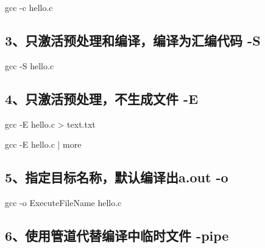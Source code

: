 \documentclass[
]{article}
\newenvironment{Shaded}{}{}
\newcommand{\NormalTok}[1]{#1}
\begin{document}
\begin{Shaded}
\begin{Highlighting}[]
\NormalTok{gcc {-}c hello.c}
\end{Highlighting}
\end{Shaded}

\hypertarget{3ux53eaux6fc0ux6d3bux9884ux5904ux7406ux548cux7f16ux8bd1ux7f16ux8bd1ux4e3aux6c47ux7f16ux4ee3ux7801--s}{%
\subsection{3、只激活预处理和编译，编译为汇编代码
-S}\label{3ux53eaux6fc0ux6d3bux9884ux5904ux7406ux548cux7f16ux8bd1ux7f16ux8bd1ux4e3aux6c47ux7f16ux4ee3ux7801--s}}

\begin{Shaded}
\begin{Highlighting}[]
\NormalTok{gcc {-}S hello.c}
\end{Highlighting}
\end{Shaded}

\hypertarget{4ux53eaux6fc0ux6d3bux9884ux5904ux7406ux4e0dux751fux6210ux6587ux4ef6--e}{%
\subsection{4、只激活预处理，不生成文件
-E}\label{4ux53eaux6fc0ux6d3bux9884ux5904ux7406ux4e0dux751fux6210ux6587ux4ef6--e}}

\begin{Shaded}
\begin{Highlighting}[]
\NormalTok{gcc {-}E hello.c \textgreater{} text.txt
}
\NormalTok{gcc {-}E hello.c | more}
\end{Highlighting}
\end{Shaded}

\hypertarget{5ux6307ux5b9aux76eeux6807ux540dux79f0ux9ed8ux8ba4ux7f16ux8bd1ux51faaout--o}{%
\subsection{5、指定目标名称，默认编译出a.out
-o}\label{5ux6307ux5b9aux76eeux6807ux540dux79f0ux9ed8ux8ba4ux7f16ux8bd1ux51faaout--o}}

\begin{Shaded}
\begin{Highlighting}[]
\NormalTok{gcc {-}o ExecuteFileName hello.c}
\end{Highlighting}
\end{Shaded}

\hypertarget{6ux4f7fux7528ux7ba1ux9053ux4ee3ux66ffux7f16ux8bd1ux4e2dux4e34ux65f6ux6587ux4ef6--pipe}{%
\subsection{6、使用管道代替编译中临时文件
-pipe}\label{6ux4f7fux7528ux7ba1ux9053ux4ee3ux66ffux7f16ux8bd1ux4e2dux4e34ux65f6ux6587ux4ef6--pipe}}
\end{document}
